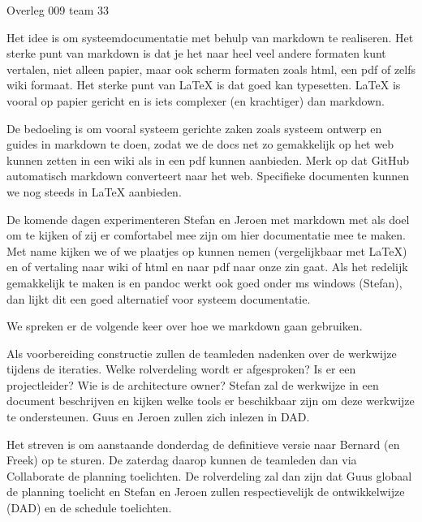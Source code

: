 \documentclass{article}
\begin{document}
\begin{Minutes}{Overleg 009 team 33}

Het idee is om systeemdocumentatie met behulp van markdown te realiseren. 
Het sterke punt van markdown is dat je het naar
heel veel andere formaten kunt vertalen, niet alleen papier, maar ook scherm formaten
zoals html, een pdf of zelfs wiki formaat. Het sterke punt van LaTeX is dat
goed kan typesetten. LaTeX is vooral op papier gericht en is iets complexer (en krachtiger)
dan markdown. 

De bedoeling is om vooral systeem gerichte zaken zoals systeem ontwerp en guides
in markdown te doen, zodat we de docs net zo gemakkelijk op het web kunnen zetten
in een wiki als in een pdf kunnen aanbieden. Merk op dat GitHub automatisch
markdown converteert naar het web.
Specifieke documenten kunnen we nog steeds in LaTeX aanbieden.


De komende dagen experimenteren Stefan en Jeroen met markdown met als doel om
te kijken of zij er comfortabel mee zijn om hier documentatie mee te maken.
Met name kijken we of we plaatjes op kunnen nemen (vergelijkbaar met LaTeX) en 
of vertaling naar wiki of html en naar pdf naar onze zin gaat. Als het redelijk
gemakkelijk te maken is en pandoc werkt ook goed onder ms windows (Stefan), dan
lijkt dit een goed alternatief voor systeem documentatie.

We spreken er de volgende keer over hoe we markdown gaan gebruiken.



Als voorbereiding constructie zullen de teamleden nadenken over de werkwijze tijdens
de iteraties. Welke rolverdeling wordt er afgesproken? Is er een projectleider?
Wie is de architecture owner? Stefan zal de werkwijze in een document beschrijven en
kijken welke tools er beschikbaar zijn om deze werkwijze te ondersteunen. Guus en
Jeroen zullen zich inlezen in DAD.



Het streven is om aanstaande donderdag de definitieve versie naar Bernard (en Freek)
op te sturen. De zaterdag daarop kunnen de teamleden dan via Collaborate de planning
toelichten. De rolverdeling zal dan zijn dat Guus globaal de planning toelicht en
Stefan en Jeroen zullen respectievelijk de ontwikkelwijze (DAD) en de schedule toelichten.


\end{Minutes}
\end{document}
